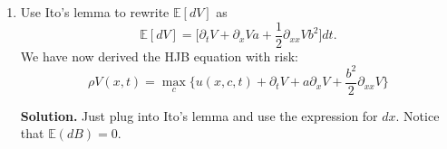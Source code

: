 \documentclass[11pt]{extarticle}
\theoremstyle{plain}
\theoremstyle{definition}
\begin{document}
\begin{enumerate}
\item Use Ito's lemma to rewrite $\mathbb E[dV]$ as 
\begin{equation*}
	\mathbb E[dV] = \bigg[ \partial_t V + \partial_x V a + \frac{1}{2} \partial_{xx} V b^2 \bigg] dt.
\end{equation*}
We have now derived the HJB equation with risk:
\begin{equation*}
		\rho V(x, t) = \max_c \bigg\{ u(x, c, t) + \partial_t V + a \partial_x V + \frac{b^2}{2} \partial_{xx} V \bigg\}
\end{equation*}


\vspace{5mm}
\noindent
\textbf{Solution.} Just plug into Ito's lemma and use the expression for $dx$. Notice that $\mathbb E(dB) = 0$. 

\end{enumerate}
\end{document}
